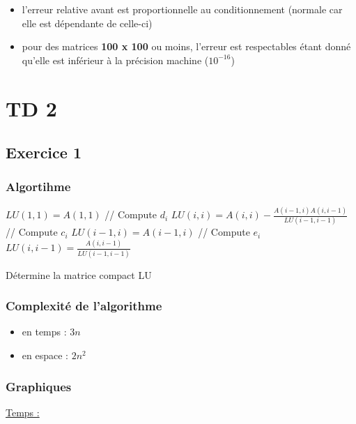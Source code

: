 \documentclass[12pt, letterpaper]{article}
\begin{document}
\begin{itemize}
\item l'erreur relative avant est proportionnelle au conditionnement
  (normale car elle est dépendante de celle-ci)
\item pour des matrices \textbf{100 x 100} ou moins, l'erreur est
  respectables étant donné qu'elle est inférieur à la précision
  machine ($10^{-16}$)
\end{itemize}

\section*{TD 2}

\subsection*{Exercice 1}

\subsubsection*{Algortihme}

\begin{algorithm} [H]
  \SetAlgoLined
  
  $LU(1, 1) = A(1, 1)$\;
   {
    // Compute $d_i$\;
    $LU(i, i) = A(i, i) - \frac{A(i-1, i) A(i, i-1)}{LU(i-1,
      i-1)}$\;
    // Compute $c_i$\;
    $LU(i-1, i) = A(i-1, i)$\;
    // Compute $e_i$\;
    $LU(i, i-1) = \frac{A(i, i-1)}{LU(i-1, i-1)}$\;
  }

  \caption{Détermine la matrice compact LU}
\end{algorithm}

\subsubsection*{Complexité de l'algorithme}

\begin{itemize}
\item en temps : $3n$
\item en espace : $2n^2$
\end{itemize}

\subsubsection*{Graphiques}

\underline{Temps :}
\end{document}
